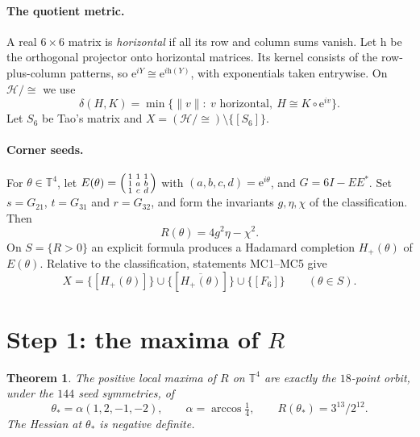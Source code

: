 \documentclass[11pt]{article}
\newtheorem{theorem}{Theorem}
\theoremstyle{remark}
\newcommand{\Had}{\mathcal H}
\newcommand{\hor}{\mathrm h}
\newcommand{\e}{\mathrm e}
\begin{document}
\paragraph{The quotient metric.} A real $6\times6$ matrix is \emph{horizontal} if all its row and column sums vanish. Let $\hor$ be the orthogonal projector onto horizontal matrices. Its kernel consists of the row-plus-column patterns, so $\e^{iY}\cong\e^{i\hor(Y)}$, with exponentials taken entrywise. On $\Had/{\cong}$ we use
\[
 \delta(H,K)=\min\{\|v\|:\ v\text{ horizontal},\ H\cong K\circ \e^{iv}\}.
\]
Let $S_6$ be Tao's matrix and $X=(\Had/{\cong})\setminus\{[S_6]\}$.

\paragraph{Corner seeds.} For $\theta\in\mathbb T^4$, let $E(\theta)=\begin{psmallmatrix}1&1&1\\1&a&b\\1&c&d\end{psmallmatrix}$ with $(a,b,c,d)=\e^{i\theta}$, and $G=6I-EE^*$. Set $s=G_{21}$, $t=G_{31}$ and $r=G_{32}$, and form the invariants $g,\eta,\chi$ of the classification. Then
\[
 R(\theta)=4g^2\eta-\chi^2 .
\]
On $S=\{R>0\}$ an explicit formula produces a Hadamard completion $H_+(\theta)$ of $E(\theta)$. Relative to the classification, statements MC1--MC5 give
\[
 X=\{[H_+(\theta)]\}\cup\{[\overline{H_+(\theta)}]\}\cup\{[F_6]\}\qquad(\theta\in S).
\]

\section{Step 1: the maxima of $R$}

\begin{theorem}\label{thm:max}
The positive local maxima of $R$ on $\mathbb T^4$ are exactly the $18$-point orbit, under the $144$ seed symmetries, of
\[
 \theta_*=\alpha(1,2,-1,-2),\qquad \alpha=\arccos\tfrac14,\qquad R(\theta_*)=3^{13}/2^{12}.
\]
The Hessian at $\theta_*$ is negative definite.
\end{theorem}
\end{document}
